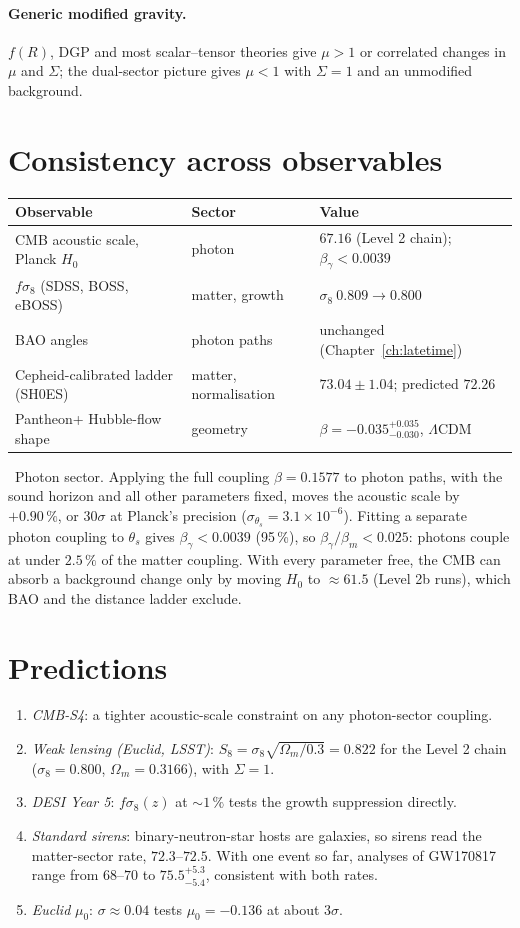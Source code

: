 \paragraph{Generic modified gravity.} $f(R)$, DGP and most scalar--tensor theories give $\mu>1$ or correlated changes in $\mu$ and $\Sigma$; the dual-sector picture gives
$\mu<1$ with $\Sigma=1$ and an unmodified background.

\section{Consistency across observables}
\begin{center}\small
\begin{tabular}{lll}\hline
Observable & Sector & Value\\\hline
CMB acoustic scale, Planck $H_0$ & photon & $67.16$ (Level 2 chain); $\beta_\gamma<0.0039$\\
$f\sigma_8$ (SDSS, BOSS, eBOSS) & matter, growth & $\sigma_8\ 0.809\to0.800$\\
BAO angles & photon paths & unchanged (Chapter~\ref{ch:latetime})\\
Cepheid-calibrated ladder (SH0ES) & matter, normalisation & $73.04\pm1.04$; predicted $72.26$\\
Pantheon+ Hubble-flow shape & geometry & $\beta=-0.035^{+0.035}_{-0.030}$, $\Lambda$CDM\\\hline
\end{tabular}
\end{center}
\calc\ Photon sector. Applying the full coupling $\beta=0.1577$ to photon paths, with the sound horizon and all other parameters fixed, moves the acoustic
scale by $+0.90\,\%$, or $30\sigma$ at Planck's precision ($\sigma_{\theta_s}=3.1\times10^{-6}$). Fitting a separate photon coupling to $\theta_s$ gives
$\beta_\gamma<0.0039$ (95\,\%), so $\beta_\gamma/\beta_m<0.025$: photons couple at under $2.5\,\%$ of the matter coupling. With every parameter free, the CMB
can absorb a background change only by moving $H_0$ to $\approx61.5$ (Level 2b runs), which BAO and the distance ladder exclude.

\section{Predictions}
\begin{enumerate}
\item \emph{CMB-S4}: a tighter acoustic-scale constraint on any photon-sector coupling.
\item \emph{Weak lensing (Euclid, LSST)}: $S_8=\sigma_8\sqrt{\Omega_m/0.3}=0.822$ for the Level 2 chain ($\sigma_8=0.800$, $\Omega_m=0.3166$), with $\Sigma=1$.
\item \emph{DESI Year 5}: $f\sigma_8(z)$ at $\sim1\,\%$ tests the growth suppression directly.
\item \emph{Standard sirens}: binary-neutron-star hosts are galaxies, so sirens read the matter-sector rate, $72.3$--$72.5$. With one event so far, analyses of GW170817 range from $68$--$70$ to $75.5^{+5.3}_{-5.4}$, consistent
with both rates.
\item \emph{Euclid} $\mu_0$: $\sigma\approx0.04$ tests $\mu_0=-0.136$ at about $3\sigma$.
\end{enumerate}
